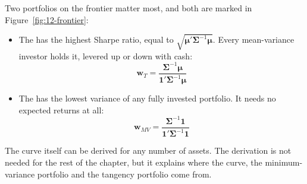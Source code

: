 Two portfolios on the frontier matter most, and both are marked in Figure~\ref{fig:12-frontier}:

\begin{itemize}
  \item The  has the highest Sharpe ratio, equal to $\sqrt{\boldsymbol{\mu}'\boldsymbol{\Sigma}^{-1}\boldsymbol{\mu}}$. Every mean-variance investor holds it, levered up or down with cash:
  \begin{equation}
    \mathbf{w}_T = \frac{\boldsymbol{\Sigma}^{-1}\boldsymbol{\mu}}{\mathbf{1}'\boldsymbol{\Sigma}^{-1}\boldsymbol{\mu}}
    \label{eq:12-tangency}
  \end{equation}
  \item The  has the lowest variance of any fully invested portfolio. It needs no expected returns at all:
  \begin{equation}
    \mathbf{w}_{MV} = \frac{\boldsymbol{\Sigma}^{-1}\mathbf{1}}{\mathbf{1}'\boldsymbol{\Sigma}^{-1}\mathbf{1}}
    \label{eq:12-minvar}
  \end{equation}
\end{itemize}

The curve itself can be derived for any number of assets. The derivation is not needed for the rest of the chapter, but it explains where the curve, the minimum-variance portfolio and the tangency portfolio come from.

